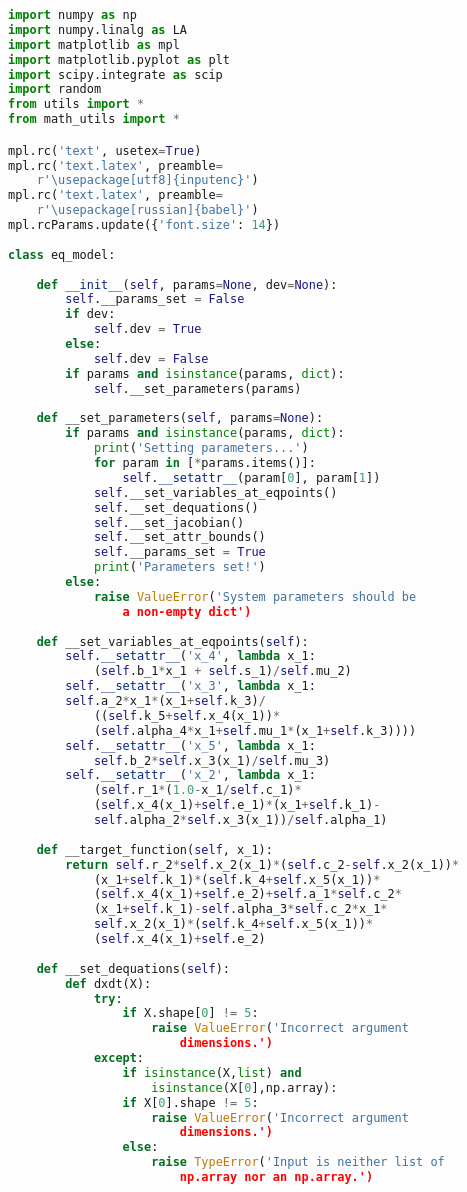 \begin{lstlisting}[language=Python, showstringspaces=false, caption=Файл \texttt{model.py}.]
import numpy as np
import numpy.linalg as LA 
import matplotlib as mpl
import matplotlib.pyplot as plt
import scipy.integrate as scip
import random
from utils import *
from math_utils import *

mpl.rc('text', usetex=True)
mpl.rc('text.latex', preamble=
	r'\usepackage[utf8]{inputenc}')
mpl.rc('text.latex', preamble=
	r'\usepackage[russian]{babel}')
mpl.rcParams.update({'font.size': 14})
	
class eq_model:
	
	def __init__(self, params=None, dev=None):
		self.__params_set = False
		if dev:
			self.dev = True
		else:
			self.dev = False
		if params and isinstance(params, dict):
			self.__set_parameters(params)
		
	def __set_parameters(self, params=None):
		if params and isinstance(params, dict):
			print('Setting parameters...')
			for param in [*params.items()]:
				self.__setattr__(param[0], param[1])
			self.__set_variables_at_eqpoints()
			self.__set_dequations()
			self.__set_jacobian()
			self.__set_attr_bounds()
			self.__params_set = True
			print('Parameters set!')
		else:
			raise ValueError('System parameters should be 
				a non-empty dict')
		
	def __set_variables_at_eqpoints(self):
		self.__setattr__('x_4', lambda x_1: 
			(self.b_1*x_1 + self.s_1)/self.mu_2)
		self.__setattr__('x_3', lambda x_1: 
		self.a_2*x_1*(x_1+self.k_3)/
			((self.k_5+self.x_4(x_1))*
			(self.alpha_4*x_1+self.mu_1*(x_1+self.k_3))))
		self.__setattr__('x_5', lambda x_1: 
			self.b_2*self.x_3(x_1)/self.mu_3)
		self.__setattr__('x_2', lambda x_1: 
			(self.r_1*(1.0-x_1/self.c_1)*
			(self.x_4(x_1)+self.e_1)*(x_1+self.k_1)-
			self.alpha_2*self.x_3(x_1))/self.alpha_1)
		
	def __target_function(self, x_1):
		return self.r_2*self.x_2(x_1)*(self.c_2-self.x_2(x_1))*
			(x_1+self.k_1)*(self.k_4+self.x_5(x_1))*
			(self.x_4(x_1)+self.e_2)+self.a_1*self.c_2*
			(x_1+self.k_1)-self.alpha_3*self.c_2*x_1*
			self.x_2(x_1)*(self.k_4+self.x_5(x_1))*
			(self.x_4(x_1)+self.e_2)
		
	def __set_dequations(self):
		def dxdt(X):
			try:
				if X.shape[0] != 5:
					raise ValueError('Incorrect argument 
						dimensions.')
			except:
				if isinstance(X,list) and 
					isinstance(X[0],np.array):
				if X[0].shape != 5:
					raise ValueError('Incorrect argument 
						dimensions.')
				else:
					raise TypeError('Input is neither list of 
						np.array nor an np.array.')
			

\end{lstlisting}
